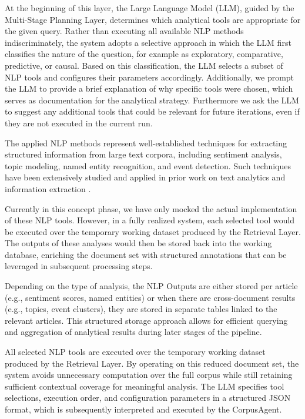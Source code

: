 At the beginning of this layer, the Large Language Model (LLM), guided by the Multi-Stage Planning Layer, determines which analytical tools are appropriate for the given query. Rather than executing all available NLP methods indiscriminately, the system adopts a selective approach in which the LLM first classifies the nature of the question, for example as exploratory, comparative, predictive, or causal. Based on this classification, the LLM selects a subset of NLP tools and configures their parameters accordingly. Additionally, we prompt the LLM to provide a brief explanation of why specific tools were chosen, which serves as documentation for the analytical strategy. Furthermore we ask the LLM to suggest any additional tools that could be relevant for future iterations, even if they are not executed in the current run.


The applied NLP methods represent well-established techniques for extracting structured information from large text corpora, including sentiment analysis, topic modeling, named entity recognition, and event detection. Such techniques have been extensively studied and applied in prior work on text analytics and information extraction \cite{jurafsky2023slp, blei2003lda, pang2008sentiment}.

Currently in this concept phase, we have only mocked the actual implementation of these NLP tools. However, in a fully realized system, each selected tool would be executed over the temporary working dataset produced by the Retrieval Layer. The outputs of these analyses would then be stored back into the working database, enriching the document set with structured annotations that can be leveraged in subsequent processing steps.

Depending on the type of analysis, the NLP Outputs are either stored per article (e.g., sentiment scores, named entities) or when there are cross-document results (e.g., topics, event clusters), they are stored in separate tables linked to the relevant articles. This structured storage approach allows for efficient querying and aggregation of analytical results during later stages of the pipeline.


All selected NLP tools are executed over the temporary working dataset produced by the Retrieval Layer. By operating on this reduced document set, the system avoids unnecessary computation over the full corpus while still retaining sufficient contextual coverage for meaningful analysis. The LLM specifies tool selections, execution order, and configuration parameters in a structured JSON format, which is subsequently interpreted and executed by the CorpusAgent.


